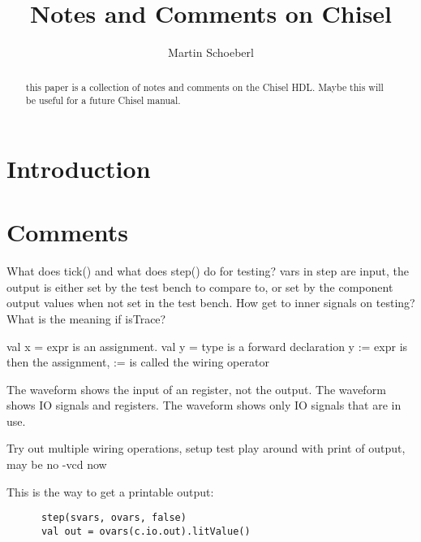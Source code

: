 \documentclass[a4paper, conference]{IEEEtran}
\begin{document}
\title{Notes and Comments on Chisel}

\author{Martin Schoeberl}




\maketitle \thispagestyle{empty}

\begin{abstract}
this paper is a collection of notes and comments on the Chisel HDL.
Maybe this will be useful for a future Chisel manual.
\end{abstract}


\section{Introduction}
\label{sec:intro}

\section{Comments}

What does tick() and what does step() do for testing?
  vars in step are input, the output is either set by the test bench to compare to, or set by the component output values when not set in the test bench.
How get to inner signals on testing?
What is the meaning if isTrace?

val x = expr is an assignment.
val y = type is a forward declaration
y := expr is then the assignment, := is called the wiring operator

The waveform shows the input of an register, not the output.
The waveform shows IO signals and registers.
The waveform shows only IO signals that are in use.

Try out multiple wiring operations, setup test play around with print of output, may be no -vcd now

This is the way to get a printable output:

\begin{verbatim}
      step(svars, ovars, false)
      val out = ovars(c.io.out).litValue()
\end{verbatim}
\end{document}
